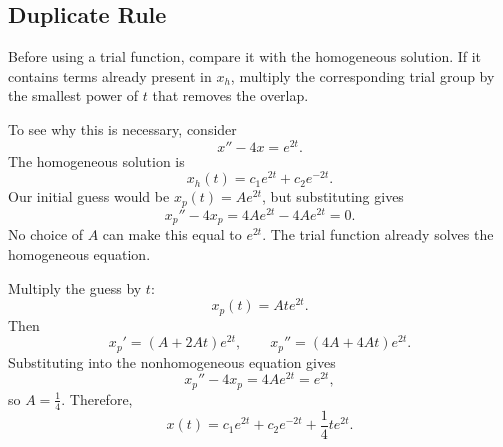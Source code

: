 \documentclass[10pt,letterpaper]{article}
\begin{document}
\subsection{Duplicate Rule}

Before using a trial function, compare it with the
homogeneous solution. If it contains terms already present
in $x_h$, multiply the corresponding trial group by the
smallest power of $t$ that removes the overlap. 

To see why this is necessary, consider
\[
x''-4x=e^{2t}.
\]
The homogeneous solution is
\[
x_h(t)=c_1e^{2t}+c_2e^{-2t}.
\]
Our initial guess would be $x_p(t)=Ae^{2t}$, but substituting
gives
\[
x_p''-4x_p=4Ae^{2t}-4Ae^{2t}=0.
\]
No choice of $A$ can make this equal to $e^{2t}$.
The trial function already solves the homogeneous equation.

Multiply the guess by $t$:
\[
x_p(t)=Ate^{2t}.
\]
Then
\[
x_p'=(A+2At)e^{2t},
\qquad
x_p''=(4A+4At)e^{2t}.
\]
Substituting into the nonhomogeneous equation gives
\[
x_p''-4x_p=4Ae^{2t}=e^{2t},
\]
so $A=\frac14$. Therefore,
\[
\boxed{x(t)=c_1e^{2t}+c_2e^{-2t}+\frac14te^{2t}.}
\]
\end{document}
